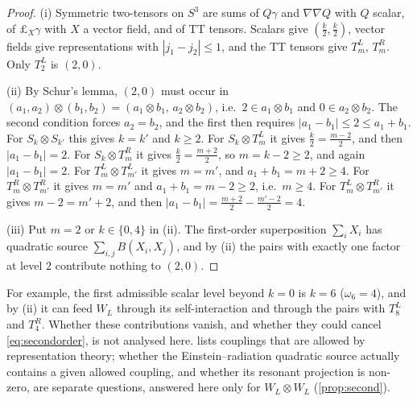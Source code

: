 \documentclass[11pt]{article}
\theoremstyle{canonmath}
\theoremstyle{canonpostulate}
\theoremstyle{canonproposition}
\theoremstyle{canonmath}
\theoremstyle{canonproposition}
\begin{document}
\begin{proof}
(i) Symmetric two-tensors on $S^3$ are sums of $Q\gamma$ and $\nabla\nabla Q$ with $Q$ scalar, of $\pounds_X\gamma$ with $X$ a vector field, and of TT tensors. Scalars give $(\tfrac k2,\tfrac k2)$, vector fields give representations with $|j_1-j_2|\le1$, and the TT tensors give $T^L_m$, $T^R_m$. Only $T^L_2$ is $(2,0)$.

(ii) By Schur's lemma, $(2,0)$ must occur in $(a_1,a_2)\otimes(b_1,b_2) = (a_1\otimes b_1,\,a_2\otimes b_2)$, i.e.\ $2\in a_1\otimes b_1$ and $0\in a_2\otimes b_2$. The second condition forces $a_2 = b_2$, and the first then requires $|a_1-b_1|\le2\le a_1+b_1$. For $S_k\otimes S_{k'}$ this gives $k = k'$ and $k\ge2$. For $S_k\otimes T^L_m$ it gives $\tfrac k2 = \tfrac{m-2}2$, and then $|a_1-b_1| = 2$. For $S_k\otimes T^R_m$ it gives $\tfrac k2 = \tfrac{m+2}2$, so $m = k-2\ge2$, and again $|a_1-b_1| = 2$. For $T^L_m\otimes T^L_{m'}$ it gives $m = m'$, and $a_1 + b_1 = m+2\ge4$. For $T^R_m\otimes T^R_{m'}$ it gives $m = m'$ and $a_1+b_1 = m-2\ge2$, i.e.\ $m\ge4$. For $T^L_m\otimes T^R_{m'}$ it gives $m - 2 = m'+2$, and then $|a_1-b_1| = \tfrac{m+2}2 - \tfrac{m'-2}2 = 4$.

(iii) Put $m = 2$ or $k\in\{0,4\}$ in (ii). The first-order superposition $\sum_iX_i$ has quadratic source $\sum_{i,j}B(X_i,X_j)$, and by (ii) the pairs with exactly one factor at level $2$ contribute nothing to $(2,0)$.
\end{proof}

For example, the first admissible scalar level beyond $k=0$ is $k = 6$ ($\omega_6 = 4$), and by (ii) it can feed $W_L$ through its self-interaction and through the pairs with $T^L_8$ and $T^R_4$. Whether these contributions vanish, and whether they could cancel \eqref{eq:secondorder}, is not analysed here.  lists couplings that are allowed by representation theory; whether the Einstein--radiation quadratic source actually contains a given allowed coupling, and whether its resonant projection is non-zero, are separate questions, answered here only for $W_L\otimes W_L$ (\cref{prop:second}).
\end{document}
